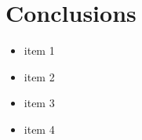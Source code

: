 \newpage
\chapter*{Conclusions}

\begin{itemize}
  \item item 1
  \item item 2
  \item item 3
  \item item 4
\end{itemize}